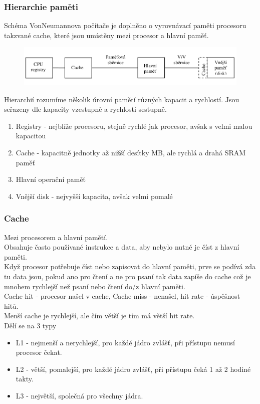 \subsubsection*{Hierarchie paměti}
Schéma VonNeumannova počítače je doplněno o vyrovnávací paměti procesoru takzvané cache, které jsou umístěny mezi procesor a hlavní paměť.
\begin{figure}[h!]
    \centering
    \includegraphics[width = \textwidth]{img/Hierarchie.png}
\end{figure}
Hierarchií rozumíme několik úrovní pamětí různých kapacit a rychlostí. Jsou seřazeny dle kapacity vzestupně a rychlosti sestupně.
\begin{enumerate}
    \item Registry - nejblíže procesoru, stejně rychlé jak procesor, avšak s velmi malou kapacitou
    \item Cache - kapacitně jednotky až nižší desítky MB, ale rychlá a drahá SRAM paměť
    \item Hlavní operační paměť
    \item Vnější disk - nejvyšší kapacita, avšak velmi pomalé
\end{enumerate}
\subsubsection*{Cache}
Mezi procesorem a hlavní pamětí. \\
Obsahuje často používané instrukce a data, aby nebylo nutné je číst z hlavní paměti. \\
Když procesor potřebuje číst nebo zapisovat do hlavní paměti, prve se podívá zda tu data jsou, pokud ano pro čtení a ne pro psaní tak data zapíše do cache což je mnohem rychlejší než psaní nebo čtení do/z hlavní paměti. \\
Cache hit - procesor našel v cache, Cache miss - nenašel, hit rate - úspěšnost hitů.\\
Menší cache je rychlejší, ale čím větší je tím má větší hit rate.\\
Dělí se na 3 typy
\begin{itemize}
    \item L1 - nejmenší a nerychlejší, pro každé jádro zvlášť, při přístupu nemusí procesor čekat.
    \item L2 - větší, pomalejší, pro každé jádro zvlášť, při přístupu čeká 1 až 2 hodiné takty.
    \item L3 - největší, společná pro všechny jádra.
\end{itemize}

